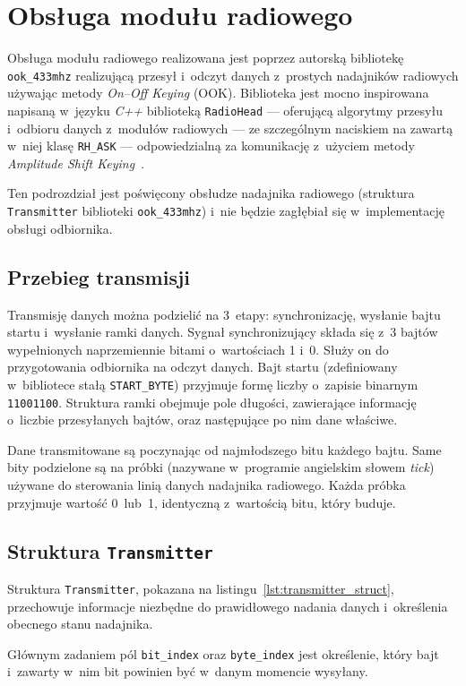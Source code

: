 \section{Obsługa modułu radiowego}
Obsługa modułu radiowego realizowana jest poprzez autorską 
bibliotekę \texttt{ook\_433mhz} realizującą przesył i~odczyt
danych z~prostych nadajników radiowych używając metody
\textit{On--Off Keying} (OOK).
Biblioteka jest mocno inspirowana napisaną w~języku \textit{C++} 
biblioteką \texttt{RadioHead} --- oferującą algorytmy przesyłu i~odbioru danych 
z~modułów radiowych --- ze szczególnym naciskiem na zawartą w~niej 
klasę \texttt{RH\_ASK} --- odpowiedzialną za komunikację z~użyciem metody 
\textit{Amplitude Shift Keying}~\cite{mccauley_radiohead}.

Ten podrozdział jest poświęcony obsłudze nadajnika radiowego
(struktura \texttt{Transmitter} biblioteki \texttt{ook\_433mhz})
i~nie będzie zagłębiał się w~implementację obsługi odbiornika.

\subsection{Przebieg transmisji}
Transmisję danych można podzielić na 3~etapy: synchronizację,
wysłanie bajtu startu i~wysłanie ramki danych.
Sygnał synchronizujący składa się z~3 bajtów wypełnionych naprzemiennie 
bitami o~wartościach 1 i~0. Służy on do przygotowania odbiornika na 
odczyt danych.
Bajt startu (zdefiniowany w~bibliotece stałą \texttt{START\_BYTE})
przyjmuje formę liczby o~zapisie binarnym \texttt{11001100}.
Struktura ramki obejmuje pole długości, zawierające informację 
o~liczbie przesyłanych bajtów, oraz następujące po nim 
dane właściwe.

Dane transmitowane są poczynając od najmłodszego bitu każdego bajtu.
Same bity podzielone są na próbki (nazywane w~programie angielskim słowem 
\textit{tick}) używane do sterowania linią danych nadajnika radiowego.
Każda próbka przyjmuje wartość 0~lub~1, identyczną z~wartością bitu, który 
buduje.

\subsection{Struktura \texttt{Transmitter}}
Struktura \texttt{Transmitter}, pokazana na listingu~\ref{lst:transmitter_struct},
przechowuje informacje niezbędne do prawidłowego nadania danych i~określenia
obecnego stanu nadajnika.

Głównym zadaniem pól \texttt{bit\_index} oraz \texttt{byte\_index} jest określenie,
który bajt i~zawarty w~nim bit powinien być w~danym momencie wysyłany.

